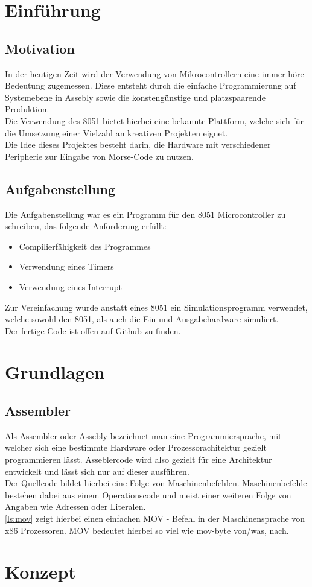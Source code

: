\documentclass[a4paper]{article}
\begin{document}
	\section{Einführung}
	\subsection{Motivation}
	In der heutigen Zeit wird der Verwendung von Mikrocontrollern eine immer höre Bedeutung zugemessen. Diese entsteht durch die einfache Programmierung auf Systemebene in Assebly sowie die konstengünstige und platzspaarende Produktion.\\
	Die Verwendung des 8051  bietet hierbei eine bekannte Plattform, welche sich für die Umsetzung einer Vielzahl an kreativen Projekten eignet.\\
	Die Idee dieses Projektes besteht darin, die Hardware mit verschiedener Peripherie zur Eingabe von Morse-Code zu nutzen.\\
	\subsection{Aufgabenstellung}
	Die Aufgabenstellung war es ein Programm für den 8051 Microcontroller zu schreiben, das folgende Anforderung erfüllt:
	\begin{itemize}
		\item Compilierfähigkeit des Programmes
		\item Verwendung eines Timers
		\item Verwendung eines Interrupt
	\end{itemize}
	Zur Vereinfachung wurde anstatt eines 8051 ein Simulationsprogramm verwendet, welche sowohl den 8051, als auch die Ein und Ausgabehardware simuliert.\\
	Der fertige Code ist offen auf Github zu finden.
	
	
	\section{Grundlagen}
	\subsection{Assembler}
	Als Assembler oder Assebly bezeichnet man eine Programmiersprache, mit welcher sich eine bestimmte Hardware oder Prozessorachitektur gezielt programmieren lässt. Asseblercode wird also gezielt für eine Architektur entwickelt und lässt sich nur auf dieser ausführen.\\
	Der Quellcode bildet hierbei eine Folge von Maschinenbefehlen. Maschinenbefehle bestehen dabei aus einem Operationscode und meist einer weiteren Folge von Angaben wie Adressen oder Literalen.\\
	\ref{ls:mov} zeigt hierbei einen einfachen MOV - Befehl in  der Maschinensprache von x86 Prozessoren. MOV bedeutet hierbei so viel wie mov-byte von/was, nach.\\
	
	\section{Konzept}
\end{document}
